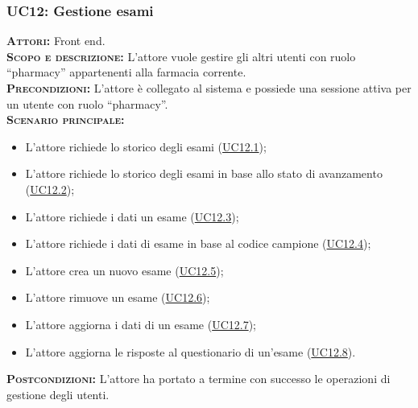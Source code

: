 \subsubsection{UC12: Gestione esami}
\label{sec:UC12}
\textsc{\textbf{Attori:}} Front end.\\
\textsc{\textbf{Scopo e descrizione:}} L'attore vuole gestire gli altri utenti con ruolo ``pharmacy'' appartenenti alla farmacia corrente.\\
\textsc{\textsc{\textbf{Precondizioni:}}} L'attore è collegato al sistema e possiede una sessione attiva per un utente con ruolo ``pharmacy''.\\
\textsc{\textbf{Scenario principale:}}
\begin{itemize}
    \item L'attore richiede lo storico degli esami (\hyperref[sec:UC121]{UC12.1});
    \item L'attore richiede lo storico degli esami in base allo stato di avanzamento (\hyperref[sec:UC122]{UC12.2});
    \item L'attore richiede i dati un esame (\hyperref[sec:UC123]{UC12.3});
    \item L'attore richiede i dati di esame in base al codice campione (\hyperref[sec:UC124]{UC12.4});
    \item L'attore crea un nuovo esame (\hyperref[sec:UC125]{UC12.5});
    \item L'attore rimuove un esame (\hyperref[sec:UC126]{UC12.6});
    \item L'attore aggiorna i dati di un esame (\hyperref[sec:UC127]{UC12.7});
    \item L'attore aggiorna le risposte al questionario di un'esame (\hyperref[sec:UC128]{UC12.8}).
\end{itemize}
\textsc{\textbf{Postcondizioni:}} L'attore ha portato a termine con successo le operazioni di gestione degli utenti.

